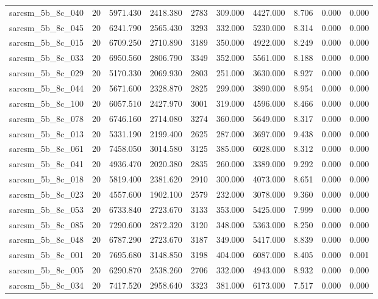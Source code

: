 \begin{tabular}{lrrrrrrrrr}
sarcsm\_5b\_8c\_040 & 20 & 5971.430 & 2418.380 & 2783 & 309.000 & 4427.000 & 8.706 & 0.000 & 0.000 \\
sarcsm\_5b\_8c\_045 & 20 & 6241.790 & 2565.430 & 3293 & 332.000 & 5230.000 & 8.314 & 0.000 & 0.000 \\
sarcsm\_5b\_8c\_015 & 20 & 6709.250 & 2710.890 & 3189 & 350.000 & 4922.000 & 8.249 & 0.000 & 0.000 \\
sarcsm\_5b\_8c\_033 & 20 & 6950.560 & 2806.790 & 3349 & 352.000 & 5561.000 & 8.188 & 0.000 & 0.000 \\
sarcsm\_5b\_8c\_029 & 20 & 5170.330 & 2069.930 & 2803 & 251.000 & 3630.000 & 8.927 & 0.000 & 0.000 \\
sarcsm\_5b\_8c\_044 & 20 & 5671.600 & 2328.870 & 2825 & 299.000 & 3890.000 & 8.954 & 0.000 & 0.000 \\
sarcsm\_5b\_8c\_100 & 20 & 6057.510 & 2427.970 & 3001 & 319.000 & 4596.000 & 8.466 & 0.000 & 0.000 \\
sarcsm\_5b\_8c\_078 & 20 & 6746.160 & 2714.080 & 3274 & 360.000 & 5649.000 & 8.317 & 0.000 & 0.000 \\
sarcsm\_5b\_8c\_013 & 20 & 5331.190 & 2199.400 & 2625 & 287.000 & 3697.000 & 9.438 & 0.000 & 0.000 \\
sarcsm\_5b\_8c\_061 & 20 & 7458.050 & 3014.580 & 3125 & 385.000 & 6028.000 & 8.312 & 0.000 & 0.000 \\
sarcsm\_5b\_8c\_041 & 20 & 4936.470 & 2020.380 & 2835 & 260.000 & 3389.000 & 9.292 & 0.000 & 0.000 \\
sarcsm\_5b\_8c\_018 & 20 & 5819.400 & 2381.620 & 2910 & 300.000 & 4073.000 & 8.651 & 0.000 & 0.000 \\
sarcsm\_5b\_8c\_023 & 20 & 4557.600 & 1902.100 & 2579 & 232.000 & 3078.000 & 9.360 & 0.000 & 0.000 \\
sarcsm\_5b\_8c\_053 & 20 & 6733.840 & 2723.670 & 3133 & 353.000 & 5425.000 & 7.999 & 0.000 & 0.000 \\
sarcsm\_5b\_8c\_085 & 20 & 7290.600 & 2872.320 & 3120 & 348.000 & 5363.000 & 8.250 & 0.000 & 0.000 \\
sarcsm\_5b\_8c\_048 & 20 & 6787.290 & 2723.670 & 3187 & 349.000 & 5417.000 & 8.839 & 0.000 & 0.000 \\
sarcsm\_5b\_8c\_001 & 20 & 7695.680 & 3148.850 & 3198 & 404.000 & 6087.000 & 8.405 & 0.000 & 0.001 \\
sarcsm\_5b\_8c\_005 & 20 & 6290.870 & 2538.260 & 2706 & 332.000 & 4943.000 & 8.932 & 0.000 & 0.000 \\
sarcsm\_5b\_8c\_034 & 20 & 7417.520 & 2958.640 & 3323 & 381.000 & 6173.000 & 7.517 & 0.000 & 0.000 \\

\end{tabular}
